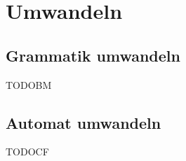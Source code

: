 

\chapter{Umwandeln}\label{ConverTo}


\section{Grammatik umwandeln}

TODOBM


\section{Automat umwandeln}

TODOCF